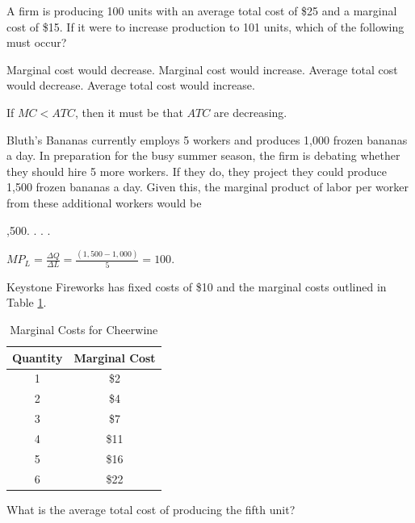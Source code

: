 \documentclass[addpoints,11pt]{exam}
\theoremstyle{definition}
\begin{document}
\begin{questions}
			\question A firm is producing 100 units with an average total cost of \$25 and a marginal cost of \$15. If it were to increase production to 101 units, which of the following must occur?
			
			\begin{choices}
				\choice Marginal cost would decrease.
				\choice Marginal cost would increase.
				\CorrectChoice Average total cost would decrease.
				\choice Average total cost would increase.
			\end{choices}
			
			\begin{solution}
				If $MC < ATC$, then it must be that $ATC$ are decreasing.
			\end{solution}
			
			\question Bluth's Bananas currently employs 5 workers and produces 1,000 frozen bananas a day. In preparation for the busy summer season, the firm is debating whether they should hire 5 more workers. If they do, they project they could produce 1,500 frozen bananas a day. Given this, the marginal product of labor per worker from these additional workers would be
			
			\begin{choices}
				\choice 1,500.
				\choice 500.
				\choice 150.
				\CorrectChoice 100.
			\end{choices}
			
			\begin{solution}
				$MP_L = \frac{\Delta Q}{\Delta L} = \frac{(1,500 - 1,000)}{5} = 100.$
			\end{solution}
			
\question Keystone Fireworks has fixed costs of \$10 and the marginal costs outlined in Table \ref{MC9}.

\begin{table}[H]
	\caption{Marginal Costs for Cheerwine}
	\label{MC9}
	\centering
	\begin{tabular}{  c| c}   
		Quantity & Marginal Cost\\
		\hline
		1 & \$2 \\
		2 & \$4 \\
		3 & \$7 \\
		4 & \$11 \\
		5 & \$16 \\
		6 & \$22 \\
	\end{tabular}
\end{table}

What is the average total cost of producing the fifth unit?


\end{questions}
\end{document}

